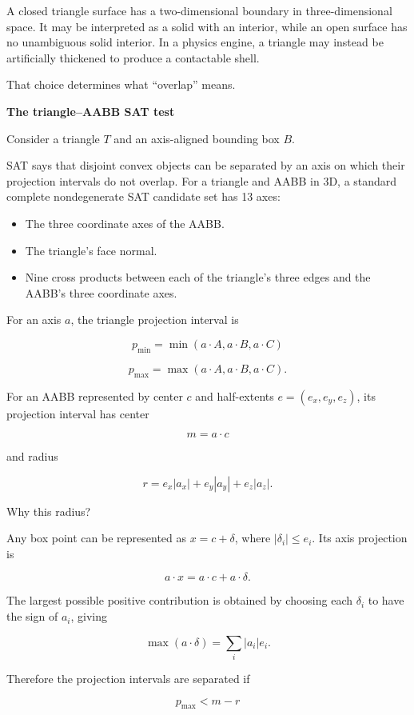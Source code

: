 A closed triangle surface has a two-dimensional boundary in three-dimensional space. It may be interpreted as a solid with an interior, while an open surface has no unambiguous solid interior. In a physics engine, a triangle may instead be artificially thickened to produce a contactable shell.

That choice determines what ``overlap'' means.

\textbf{The triangle--AABB SAT test}

Consider a triangle \(T\) and an axis-aligned bounding box \(B\).

SAT says that disjoint convex objects can be separated by an axis on which their projection intervals do not overlap. For a triangle and AABB in 3D, a standard complete nondegenerate SAT candidate set has 13 axes:

\begin{itemize}
\tightlist
\item
  The three coordinate axes of the AABB.
\item
  The triangle's face normal.
\item
  Nine cross products between each of the triangle's three edges and the AABB's three coordinate axes.
\end{itemize}

For an axis \(a\), the triangle projection interval is

\[
p_{\min}=\min(a\cdot A,a\cdot B,a\cdot C)
\]

\[
p_{\max}=\max(a\cdot A,a\cdot B,a\cdot C).
\]

For an AABB represented by center \(c\) and half-extents \(e=(e_x,e_y,e_z)\), its projection interval has center

\[
m=a\cdot c
\]

and radius

\[
r=e_x|a_x|+e_y|a_y|+e_z|a_z|.
\]

Why this radius?

Any box point can be represented as \(x=c+\delta\), where \(|\delta_i|\le e_i\). Its axis projection is

\[
a\cdot x=a\cdot c+a\cdot\delta.
\]

The largest possible positive contribution is obtained by choosing each \(\delta_i\) to have the sign of \(a_i\), giving

\[
\max(a\cdot\delta)=\sum_i |a_i|e_i.
\]

Therefore the projection intervals are separated if

\[
p_{\max}<m-r
\]

